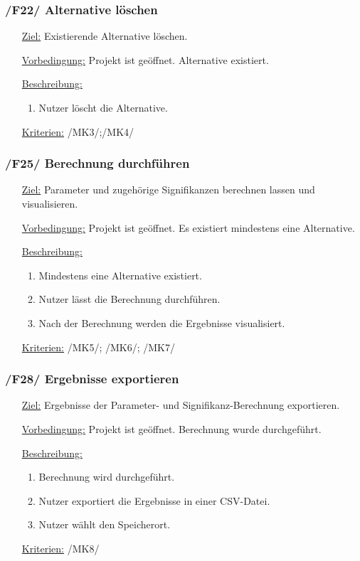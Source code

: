 \documentclass{article}
\begin{document}
\subsubsection*{/F22/ Alternative löschen}
\begin{itemize}
    \item[\underline{Ziel:}] Existierende Alternative löschen.
    \item[\underline{Vorbedingung:}] Projekt ist geöffnet. Alternative existiert.
    \item[\underline{Beschreibung:}]
    \begin{enumerate}
        \item Nutzer löscht die Alternative.
    \end{enumerate}
    \item[\underline{Kriterien:}] /MK3/;/MK4/
\end{itemize}

\subsubsection*{/F25/ Berechnung durchführen}
\begin{itemize}
    \item[\underline{Ziel:}] Parameter und zugehörige Signifikanzen berechnen lassen und visualisieren.
    \item[\underline{Vorbedingung:}] Projekt ist geöffnet. Es existiert mindestens eine Alternative.
    \item[\underline{Beschreibung:}]
    \begin{enumerate}
        \item Mindestens eine Alternative existiert.
        \item Nutzer lässt die Berechnung durchführen.
        \item Nach der Berechnung werden die Ergebnisse visualisiert.
    \end{enumerate}
    \item[\underline{Kriterien:}] /MK5/; /MK6/; /MK7/ 
\end{itemize} 

\subsubsection*{/F28/ Ergebnisse exportieren}
\begin{itemize}
    \item[\underline{Ziel:}] Ergebnisse der Parameter- und Signifikanz-Berechnung exportieren.
    \item[\underline{Vorbedingung:}] Projekt ist geöffnet. Berechnung wurde durchgeführt.
    \item[\underline{Beschreibung:}]
    \begin{enumerate}
        \item Berechnung wird durchgeführt.
        \item Nutzer exportiert die Ergebnisse in einer CSV-Datei.
        \item Nutzer wählt den Speicherort.
    \end{enumerate}
    \item[\underline{Kriterien:}] /MK8/
\end{itemize}
\end{document}
